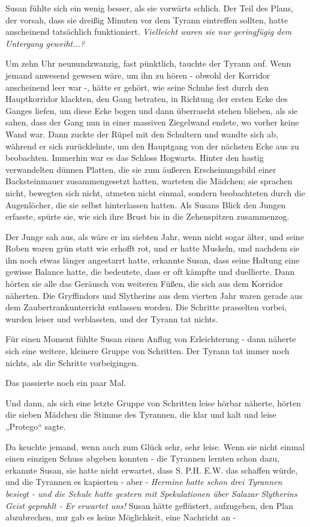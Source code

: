 {Susan fühlte sich ein wenig besser, als sie vorwärts schlich. Der Teil des Plans, der vorsah, dass sie dreißig Minuten vor dem Tyrann eintreffen sollten, hatte anscheinend tatsächlich funktioniert. \emph{Vielleicht waren sie nur geringfügig dem Untergang geweiht...?}

Um zehn Uhr neunundzwanzig, fast pünktlich, tauchte der Tyrann auf. Wenn jemand anwesend gewesen wäre, um ihn zu hören - obwohl der Korridor anscheinend leer war -, hätte er gehört, wie seine Schuhe fest durch den Hauptkorridor klackten, den Gang betraten, in Richtung der ersten Ecke des Ganges liefen, um diese Ecke bogen und dann überrascht stehen blieben, als sie sahen, dass der Gang nun in einer massiven Ziegelwand endete, wo vorher keine Wand war. Dann zuckte der Rüpel mit den Schultern und wandte sich ab, während er sich zurücklehnte, um den Hauptgang von der nächsten Ecke aus zu beobachten. Immerhin war es das Schloss Hogwarts. Hinter den hastig verwandelten dünnen Platten, die sie zum äußeren Erscheinungsbild einer Backsteinmauer zusammengesetzt hatten, warteten die Mädchen; sie sprachen nicht, bewegten sich nicht, atmeten nicht einmal, sondern beobachteten durch die Augenlöcher, die sie selbst hinterlassen hatten. Als Susans Blick den Jungen erfasste, spürte sie, wie sich ihre Brust bis in die Zehenspitzen zusammenzog.

Der Junge sah aus, als wäre er im siebten Jahr, wenn nicht sogar älter, und seine Roben waren grün statt wie erhofft rot, und er hatte Muskeln, und nachdem sie ihn noch etwas länger angestarrt hatte, erkannte Susan, dass seine Haltung eine gewisse Balance hatte, die bedeutete, dass er oft kämpfte und duellierte. Dann hörten sie alle das Geräusch von weiteren Füßen, die sich aus dem Korridor näherten. Die Gryffindors und Slytherins aus dem vierten Jahr waren gerade aus dem Zaubertrankunterricht entlassen worden. Die Schritte prasselten vorbei, wurden leiser und verblassten, und der Tyrann tat nichts.

Für einen Moment fühlte Susan einen Anflug von Erleichterung - dann näherte sich eine weitere, kleinere Gruppe von Schritten. Der Tyrann tat immer noch nichts, als die Schritte vorbeigingen.

Das passierte noch ein paar Mal.

Und dann, als sich eine letzte Gruppe von Schritten leise hörbar näherte, hörten die sieben Mädchen die Stimme des Tyrannen, die klar und kalt und leise „Protego“ sagte.

Da keuchte jemand, wenn auch zum Glück sehr, sehr leise. Wenn sie nicht einmal einen einzigen Schuss abgeben konnten - die Tyrannen lernten schon dazu, erkannte Susan, sie hatte nicht erwartet, dass S. P.H. E.W. das schaffen würde, und die Tyrannen es kapierten - aber - \emph{Hermine hatte schon drei Tyrannen besiegt - und die Schule hatte gestern mit Spekulationen über Salazar Slytherins Geist geprahlt - Er erwartet uns!} Susan hätte geflüstert, aufzugeben, den Plan abzubrechen, nur gab es keine Möglichkeit, eine Nachricht an -

}
